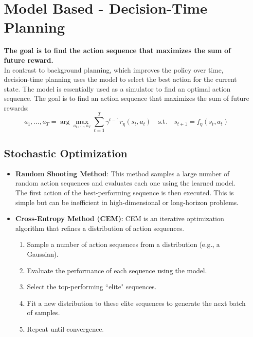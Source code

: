 \documentclass[12pt]{article}
\begin{document}
\section{Model Based - Decision-Time Planning}
\textbf{The goal is to find the action sequence that maximizes the sum of future reward.
}\\
In contrast to background planning, which improves the policy over time, decision-time planning uses the model to select the best action for the current state. The model is essentially used as a simulator to find an optimal action sequence. The goal is to find an action sequence that maximizes the sum of future rewards:
$$ a_1, \dots, a_T = \arg\max_{a_1,\dots,a_T} \sum_{t=1}^T \gamma^{t-1} r_\eta(s_t, a_t) \quad \text{s.t.} \quad s_{t+1} = f_\eta(s_t, a_t) $$

\subsection{Stochastic Optimization}
\begin{itemize}
    \item \textbf{Random Shooting Method}: This method samples a large number of random action sequences and evaluates each one using the learned model. The first action of the best-performing sequence is then executed. This is simple but can be inefficient in high-dimensional or long-horizon problems.
    \item \textbf{Cross-Entropy Method (CEM)}: CEM is an iterative optimization algorithm that refines a distribution of action sequences.
    \begin{enumerate}
        \item Sample a number of action sequences from a distribution (e.g., a Gaussian).
        \item Evaluate the performance of each sequence using the model.
        \item Select the top-performing ``elite" sequences.
        \item Fit a new distribution to these elite sequences to generate the next batch of samples.
        \item Repeat until convergence.
    \end{enumerate}
\end{itemize}
\end{document}

